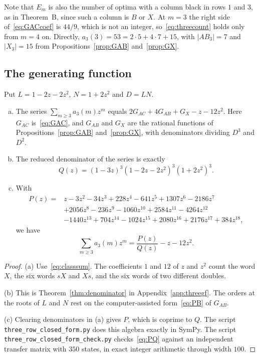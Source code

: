 Note that $E_m$ is also the number of optima with a column black in rows $1$ and $3$, as in
Theorem~B, since such a column is $B$ or $X$. At $m=3$ the right side of~\eqref{eq:GACcoef} is
$44/9$, which is not an integer, so~\eqref{eq:threecount} holds only from $m=4$ on. Directly,
$a_3(3)=53=2\cdot5+4\cdot7+15$, with $|AB_3|=7$ and $|X_3|=15$ from
Propositions~\ref{prop:GAB} and~\ref{prop:GX}.

\subsection{The generating function}

Put $L=1-2z-2z^2$, $N=1+2z^2$ and $D=LN$.

\begin{theorem}\label{thm:threegf}
\leavevmode
\begin{enumerate}[(a)]
\item The series $\sum_{m\ge3}a_3(m)z^m$ equals $2G_{AC}+4G_{AB}+G_X-z-12z^2$. Here $G_{AC}$
is~\eqref{eq:GAC}, and $G_{AB}$ and $G_X$ are the rational functions of
Propositions~\ref{prop:GAB} and~\ref{prop:GX}, with denominators dividing $D^3$ and $D^2$.
\item The reduced denominator of the series is exactly
\[
Q(z)=(1-3z)^3(1-2z-2z^2)^3(1+2z^2)^3.
\]
\item With
\begin{align*}
P(z)={}&z-3z^2-34z^3+228z^4-641z^5+1307z^6-2186z^7\\
&+2056z^8-236z^9-1060z^{10}+2584z^{11}-4264z^{12}\\
&-1440z^{13}+704z^{14}-1024z^{15}+2080z^{16}+2176z^{17}+384z^{18},
\end{align*}
we have
\begin{equation}\label{eq:PQ}
\sum_{m\ge3}a_3(m)z^m=\frac{P(z)}{Q(z)}-z-12z^2.
\end{equation}
\end{enumerate}
\end{theorem}

\begin{proof}
(a) Use~\eqref{eq:classsum}. The coefficients $1$ and $12$ of $z$ and $z^2$ count the word $X$,
the six words $sX$ and $Xs$, and the six words of two different doubles.

(b) This is Theorem~\ref{thm:denominator} in Appendix~\ref{app:threegf}. The orders at the
roots of $L$ and $N$ rest on the computer-assisted form~\eqref{eq:PB} of $G_{AB}$.

(c) Clearing denominators in (a) gives $P$, which is coprime to $Q$. The script
\texttt{three\_row\_closed\_form.py} does this algebra exactly in SymPy. The script
\texttt{three\_row\_closed\_form\_check.py} checks~\eqref{eq:PQ} against an independent transfer
matrix with $350$ states, in exact integer arithmetic through width $100$.
\end{proof}

